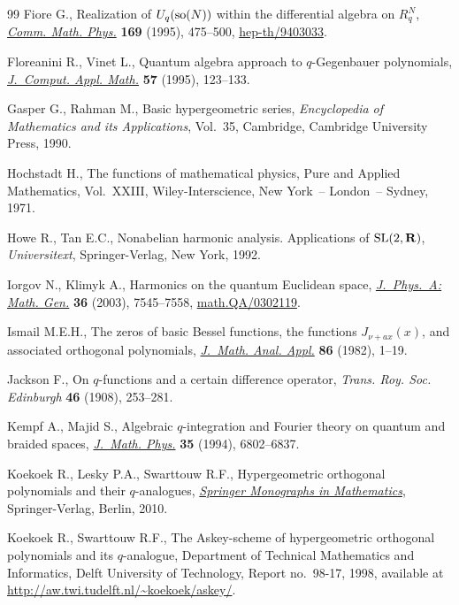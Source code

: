 \documentclass[pdftex]{sigma}
\numberwithin{equation}{section}
\begin{document}
\begin{thebibliography}{99}
Fiore G.,
Realization of $U_q({\rm so}(N))$ within the dif\/ferential algebra on $R^N_q$,
\href{http://dx.doi.org/10.1007/BF02099309}{{\it Comm. Math. Phys.}} {\bf 169} (1995), 475--500,
\href{http://arxiv.org/abs/hep-th/9403033}{hep-th/9403033}.

Floreanini R., Vinet L.,
Quantum algebra approach to $q$-Gegenbauer polynomials,
\href{http://dx.doi.org/10.1016/0377-0427(93)E0239-I}{{\it J.~Comput. Appl. Math.}} {\bf57} (1995), 123--133.


Gasper G., Rahman M.,
Basic hypergeometric series,
{\it Encyclopedia of Mathematics and its Applications}, Vol.~35, Cambridge, Cambridge University Press, 1990.

Hochstadt H.,
The functions of mathematical physics,
Pure and Applied Mathematics, Vol.~XXIII,
Wiley-Interscience, New   York~-- London~-- Sydney, 1971.

Howe R., Tan E.C.,
Nonabelian harmonic analysis. Applications of ${\rm SL}(2,{\bf R})$,
{\it Universitext}, Springer-Verlag, New York, 1992.


Iorgov N., Klimyk A.,
Harmonics on the quantum Euclidean space,
\href{http://dx.doi.org/10.1088/0305-4470/36/27/307}{{\it J.~Phys.~A: Math. Gen.}} {\bf 36} (2003), 7545--7558,
\href{http://arxiv.org/abs/math.QA/0302119}{math.QA/0302119}.

Ismail M.E.H.,
The zeros of basic Bessel functions, the functions $J_{\nu +ax}(x)$, and associated orthogonal polynomials,
\href{http://dx.doi.org/10.1016/0022-247X(82)90248-7}{{\it J.~Math. Anal. Appl.}} {\bf86} (1982), 1--19.


Jackson F.,
On $q$-functions and a certain dif\/ference operator,
{\it Trans. Roy. Soc. Edinburgh} {\bf 46} (1908), 253--281.

Kempf A., Majid S.,
Algebraic $q$-integration and Fourier theory on quantum and braided spaces,
\href{http://dx.doi.org/10.1063/1.530644}{{\it J.~Math. Phys.}} {\bf 35} (1994), 6802--6837.

Koekoek R., Lesky P.A., Swarttouw R.F.,
Hypergeometric orthogonal polynomials and their $q$-analogues,
\href{http://dx.doi.org/10.1007/978-3-642-05014-5}{{\it Springer Monographs in Mathematics}}, Springer-Verlag, Berlin, 2010.

Koekoek R., Swarttouw R.F.,
The Askey-scheme of hypergeometric orthogonal polyno\-mials and its $q$-analogue,
Department of Technical Mathematics and Informatics,
Delft University of Technology, Report no.~98-17, 1998, available at \url{http://aw.twi.tudelft.nl/~koekoek/askey/}.



\end{thebibliography}
\end{document}
